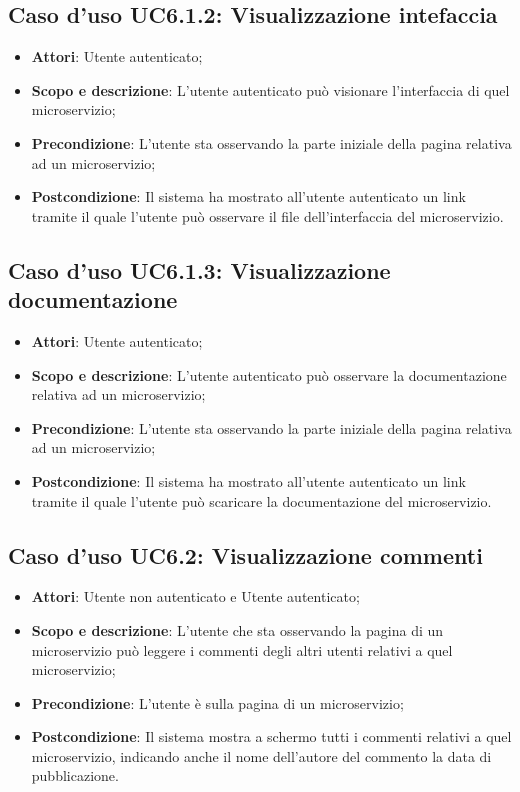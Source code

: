 \documentclass[12pt,a4paper,titlepage]{article}
\begin{document}
	\subsection{Caso d'uso UC6.1.2: Visualizzazione intefaccia}
	\label{UC6.1.2}
	\begin{itemize}
		\item \textbf{Attori}: Utente autenticato;
		\item \textbf{Scopo e descrizione}: L'utente autenticato può visionare l'interfaccia di quel microservizio;
		\item \textbf{Precondizione}: L'utente sta osservando la parte iniziale della pagina relativa ad un microservizio;
		\item \textbf{Postcondizione}: Il sistema ha mostrato all'utente autenticato un link tramite il quale l'utente può osservare il file dell'interfaccia del microservizio.
	\end{itemize}
	\subsection{Caso d'uso UC6.1.3: Visualizzazione documentazione}
	\label{UC6.1.3}
	\begin{itemize}
		\item \textbf{Attori}: Utente autenticato;
		\item \textbf{Scopo e descrizione}: L'utente autenticato può osservare la documentazione relativa ad un microservizio;
		\item \textbf{Precondizione}: L'utente sta osservando la parte iniziale della pagina relativa ad un microservizio;
		\item \textbf{Postcondizione}: Il sistema ha mostrato all'utente autenticato un link tramite il quale l'utente può scaricare la documentazione del microservizio.
	\end{itemize}

	\subsection{Caso d'uso UC6.2: Visualizzazione commenti}
	\label{UC6.2}
	\begin{itemize}
		\item \textbf{Attori}: Utente non autenticato e Utente autenticato;
		\item \textbf{Scopo e descrizione}: L'utente che sta osservando la pagina di un microservizio può leggere i commenti degli altri utenti relativi a quel microservizio;
		\item \textbf{Precondizione}: L'utente è sulla pagina di un microservizio;
		\item \textbf{Postcondizione}: Il sistema mostra a schermo tutti i commenti relativi a quel microservizio, indicando anche il nome dell'autore del commento la data di pubblicazione.
	\end{itemize}
\end{document}
